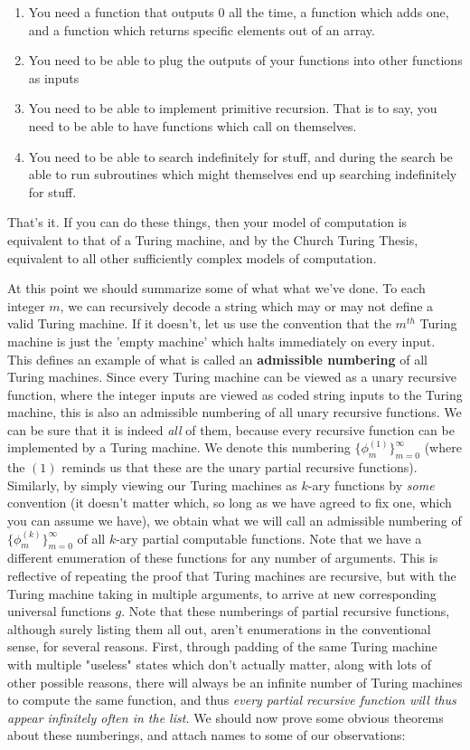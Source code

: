 \begin{enumerate}
    \item You need a function that outputs 0 all the time, a function which adds one, and a function which returns specific elements out of an array.
    \item You need to be able to plug the outputs of your functions into other functions as inputs
    \item You need to be able to implement primitive recursion. That is to say, you need to be able to have functions which call on themselves.
    \item You need to be able to search indefinitely for stuff, and during the search be able to run subroutines which might themselves end up searching indefinitely for stuff.
\end{enumerate}
That's it. If you can do these things, then your model of computation is equivalent to that of a Turing machine, and by the Church Turing Thesis, equivalent to all other sufficiently complex models of computation.
\par At this point we should summarize some of what what we've done. To each integer $m$, we can recursively decode a string which may or may not define a valid Turing machine. If it doesn't, let us use the convention that the $m^{th}$ Turing machine is just the 'empty machine' which halts immediately on every input. This defines an example of what is called an \textbf{admissible numbering} of all Turing machines. Since every Turing machine can be viewed as a unary recursive function, where the integer inputs are viewed as coded string inputs to the Turing machine, this is also an admissible numbering of all unary recursive functions. We can be sure that it is indeed \textit{all} of them, because every recursive function can be implemented by a Turing machine. We denote this numbering $\{\phi_m^{(1)}\}_{m=0}^{\infty}$ (where the $(1)$ reminds us that these are the unary partial recursive functions). Similarly, by simply viewing our Turing machines as $k$-ary functions by \textit{some} convention (it doesn't matter which, so long as we have agreed to fix one, which you can assume we have), we obtain what we will call an admissible numbering of $\{\phi_m^{(k)}\}_{m=0}^{\infty}$ of all $k$-ary partial computable functions. Note that we have a different enumeration of these functions for any number of arguments. This is reflective of repeating the proof that Turing machines are recursive, but with the Turing machine taking in multiple arguments, to arrive at new corresponding universal functions $g$. Note that these numberings of partial recursive functions, although surely listing them all out, aren't enumerations in the conventional sense, for several reasons. First, through padding of the same Turing machine with multiple "useless" states which don't actually matter, along with lots of other possible reasons, there will always be an infinite number of Turing machines to compute the same function, and thus \textit{every partial recursive function will thus appear infinitely often in the list.} We should now prove some obvious theorems about these numberings, and attach names to some of our observations:
